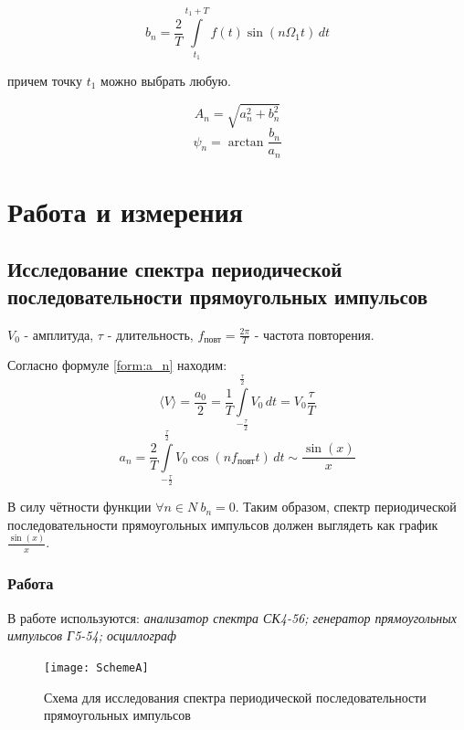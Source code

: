 \documentclass[a4paper, 12pt]{article}
\begin{document}
\begin{equation}
	b_{n} = \frac{2}{T}\int\limits_{t_{1}}^{t_{1}+T}f(t)\sin(n\Omega_{1}t)\, dt 
\label{form:b_n}
\end{equation}

причем точку $t_{1}$ можно выбрать любую.

\begin{equation}
\label{form:A_n}
	A_{n} = \sqrt{a_{n}^2+b_{n}^2}
\end{equation}
\begin{equation}
	\psi_{n} = \arctan\frac{b_{n}}{a_{n}}
\label{form:psi_n}
\end{equation}
\section{Работа и измерения}
\subsection*{Исследование спектра периодической последовательности прямоугольных импульсов}

$V_0$  - амплитуда, $\tau$ - длительность, $f_\text{повт} = \frac{2\pi}{T} $ - частота повторения.

Согласно формуле \ref{form:a_n} находим:
$$ \langle V \rangle = \frac{a_0}{2} =  \frac{1}{T}\int\limits_{ -\frac{\tau}{2} } ^ {\frac{\tau}{2} } V_0\,dt = V_0 \frac{\tau}{T}
$$
\begin{equation}
\label{form:app_a_n}
	a_n = \frac{2}{T}\int\limits_{ -\frac{\tau}{2} } ^ {\frac{\tau}{2} } V_0\cos(nf_\text{повт}t)\, dt \sim \frac{\sin(x)}{x}
\end{equation}
 
В силу чётности функции $\forall n \in {N} \ b_n=0$. Таким образом, спектр периодической последовательности прямоугольных импульсов должен выглядеть как график $\frac{\sin(x)}{x}$.
\subsubsection*{Работа}
В работе используются: \textit{анализатор спектра СК4-56; генератор прямоугольных импульсов Г5-54; осциллограф}



\begin{figure}[H]
\centering
\texttt{[image: SchemeA]}
\caption{Схема для исследования спектра периодической последовательности прямоугольных импульсов}
\label{img:scheme A}
\end{figure}
\end{document}
